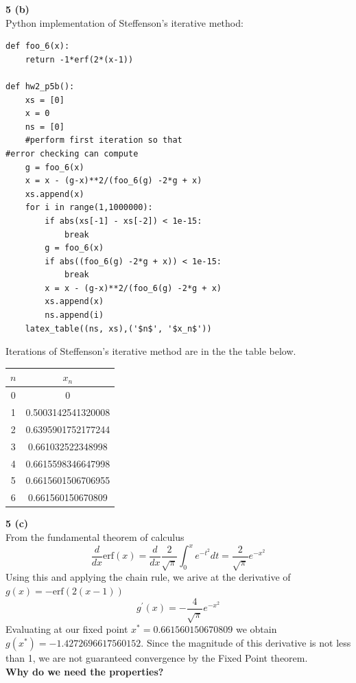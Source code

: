 \documentclass[12pt]{article}
\newcommand{\problem}[1]{\hspace{-4 ex} \large \textbf{#1}\\}
\begin{document}
\problem{5 (b)}
	Python implementation of Steffenson's iterative method:
	\singlespacing
	\begin{lstlisting}
def foo_6(x):
	return -1*erf(2*(x-1))
	
def hw2_p5b():
	xs = [0]
	x = 0
	ns = [0]
	#perform first iteration so that 
#error checking can compute
	g = foo_6(x)
	x = x - (g-x)**2/(foo_6(g) -2*g + x)
	xs.append(x)
	for i in range(1,1000000): 
		if abs(xs[-1] - xs[-2]) < 1e-15:
			break
		g = foo_6(x)
		if abs((foo_6(g) -2*g + x)) < 1e-15:
			break
		x = x - (g-x)**2/(foo_6(g) -2*g + x)
		xs.append(x)
		ns.append(i)
	latex_table((ns, xs),('$n$', '$x_n$'))
	\end{lstlisting}
	\doublespacing
	Iterations of Steffenson's iterative method are in the the table below.
	\begin{center}
		\begin{tabular}{|c|c|}
			\hline
			$n$&$x_n$\\ \hline
			0&0\\ \hline
			1&0.5003142541320008\\ \hline
			2&0.6395901752177244\\ \hline
			3&0.661032522348998\\ \hline
			4&0.6615598346647998\\ \hline
			5&0.6615601506706955\\ \hline
			6&0.661560150670809\\ \hline
		\end{tabular}
	\end{center}

\problem{5 (c)}
	From the fundamental theorem of calculus 
	$$
	\frac{d}{dx}\text{erf}(x) = \frac{d}{dx}\frac{2}{\sqrt{\pi}}\int_0^x e^{-t^2}dt = \frac{2}{\sqrt{\pi}} e^{-x^2}
	$$
	Using this and applying the chain rule, we arive at the derivative of $g(x) = -\text{erf}(2(x-1))$ \\
	$$
	g^\prime(x) = -\frac{4}{\sqrt{\pi}} e^{-x^2}
	$$
	Evaluating at our fixed point $x^* = 0.661560150670809$ we obtain $g(x^*) = -1.4272696617560152$. Since the magnitude of this derivative is not less than 1, we are not guaranteed convergence by the Fixed Point theorem. \\
	\textbf{Why do we need the properties?}
	
\end{document}
